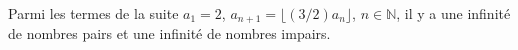 Parmi les termes de la suite $a_1 = 2$, $a_{n+1} = \lfloor (3/2)a_n \rfloor$, $n \in \mathbb{N}$, il y a une infinité de nombres pairs et une infinité de nombres impairs.
